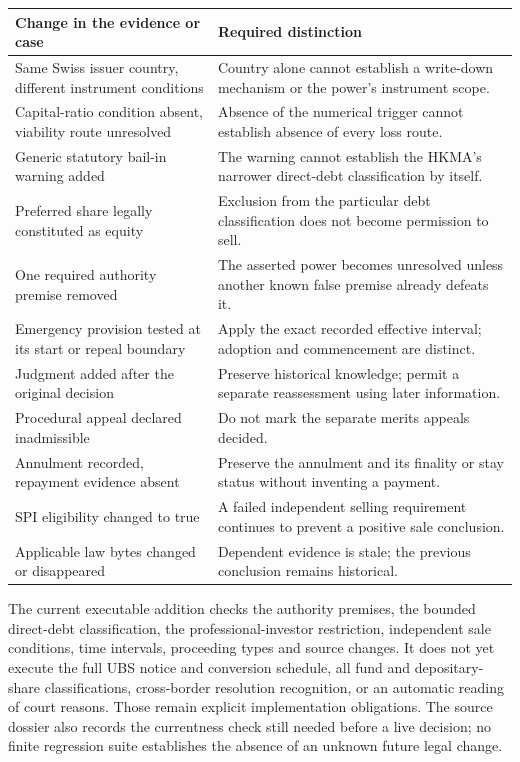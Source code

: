 \documentclass[12pt,a4paper,oneside,openany]{book}
\begin{document}
\begin{longtable}{P{0.30\textwidth}P{0.62\textwidth}}
\toprule
Change in the evidence or case & Required distinction \\
\midrule
\endhead
Same Swiss issuer country, different instrument conditions & Country alone
cannot establish a write-down mechanism or the power's instrument scope. \\
Capital-ratio condition absent, viability route unresolved & Absence of the
numerical trigger cannot establish absence of every loss route. \\
Generic statutory bail-in warning added & The warning cannot establish the
HKMA's narrower direct-debt classification by itself. \\
Preferred share legally constituted as equity & Exclusion from the particular
debt classification does not become permission to sell. \\
One required authority premise removed & The asserted power becomes unresolved
unless another known false premise already defeats it. \\
Emergency provision tested at its start or repeal boundary & Apply the exact
recorded effective interval; adoption and commencement are distinct. \\
Judgment added after the original decision & Preserve historical knowledge;
permit a separate reassessment using later information. \\
Procedural appeal declared inadmissible & Do not mark the separate merits
appeals decided. \\
Annulment recorded, repayment evidence absent & Preserve the annulment and
its finality or stay status without inventing a payment. \\
SPI eligibility changed to true & A failed independent selling requirement
continues to prevent a positive sale conclusion. \\
Applicable law bytes changed or disappeared & Dependent evidence is stale;
the previous conclusion remains historical. \\
\bottomrule
\end{longtable}

The current executable addition checks the authority premises, the bounded
direct-debt classification, the professional-investor restriction, independent
sale conditions, time intervals, proceeding types and source changes. It does
not yet execute the full UBS notice and conversion schedule, all fund and
depositary-share classifications, cross-border resolution recognition, or an
automatic reading of court reasons. Those remain explicit implementation
obligations. The source dossier also records the currentness check still needed
before a live decision; no finite regression suite establishes the absence of
an unknown future legal change.
\end{document}
